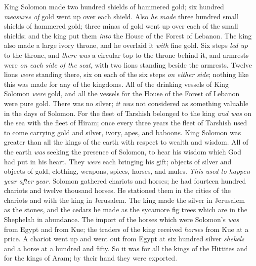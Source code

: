 \begin{biblechapter}
\verse King Solomon made two hundred shields of hammered gold; six hundred \textit{measures of} gold went up over each shield.
\verse Also \textit{he made} three hundred small shields of hammered gold; three minas of gold went up over each of the small shields; and the king put them \textit{into} the House of the Forest of Lebanon.
\verse The king also made a large ivory throne, and he overlaid it \textit{with} fine gold.
\verse Six steps \textit{led up} to the throne, and \textit{there was} a circular top to the throne behind it, and armrests were \textit{on each side of the seat}, with two lions standing beside the armrests.
\verse Twelve lions \textit{were} standing there, six on each of the six steps \textit{on either side}; nothing like this was made for any of the kingdoms.
\verse All of the drinking vessels of King Solomon \textit{were} gold, and all the vessels for the House of the Forest of Lebanon were pure gold. There was no silver; \textit{it was} not considered as something valuable in the days of Solomon.
\verse For the fleet of Tarshish belonged to the king \textit{and was} on the sea with the fleet of Hiram; once every three years the fleet of Tarshish used to come carrying gold and silver, ivory, apes, and baboons.
\verse King Solomon was greater than all the kings of the earth with respect to wealth and wisdom.
\verse All of the earth \textit{was} seeking the presence of Solomon, to hear his wisdom which God had put in his heart.
\verse They \textit{were} each bringing his gift; objects of silver and objects of gold, clothing, weapons, spices, horses, and mules. \textit{This used to happen year after year}.
\verse Solomon gathered chariots and horses; he had fourteen hundred chariots and twelve thousand horses. He stationed them in the cities of the chariots and with the king in Jerusalem.
\verse The king made the silver in Jerusalem as the stones, and the cedars he made as the sycamore fig trees which are in the Shephelah in abundance.
\verse The import of the horses which were Solomon’s \textit{was} from Egypt and from Kue; the traders of the king received \textit{horses} from Kue at a price.
\verse A chariot went up and went out from Egypt at six hundred silver \textit{shekels} and a horse at a hundred and fifty. So it was for all the kings of the Hittites and for the kings of Aram; by their hand they were exported.
\end{biblechapter}

